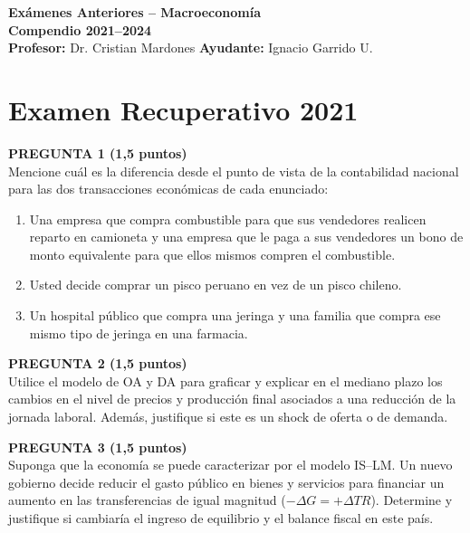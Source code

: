 \documentclass[11pt,addpoints]{article}
\begin{document}
\vspace*{0.1cm}

\begin{center}
{\Large \bfseries Exámenes Anteriores – Macroeconomía \\[0.25cm]}
\textbf{Compendio 2021–2024}\\[0.3cm]
\textbf{Profesor:} Dr. Cristian Mardones \textbf{Ayudante:} Ignacio Garrido U.
\end{center}


\section*{Examen Recuperativo 2021}

\textbf{PREGUNTA 1 (1,5 puntos)}\\[0.2cm]
Mencione cuál es la diferencia desde el punto de vista de la contabilidad nacional para las dos transacciones económicas de cada enunciado:

\begin{enumerate}[label=\alph*)]
\item Una empresa que compra combustible para que sus vendedores realicen reparto en camioneta y una empresa que le paga a sus vendedores un bono de monto equivalente para que ellos mismos compren el combustible.
\item Usted decide comprar un pisco peruano en vez de un pisco chileno.
\item Un hospital público que compra una jeringa y una familia que compra ese mismo tipo de jeringa en una farmacia.
\end{enumerate}

\vspace{0.4cm}

\textbf{PREGUNTA 2 (1,5 puntos)}\\[0.2cm]
Utilice el modelo de OA y DA para graficar y explicar en el mediano plazo los cambios en el nivel de precios y producción final asociados a una reducción de la jornada laboral. Además, justifique si este es un shock de oferta o de demanda.

\vspace{0.4cm}

\textbf{PREGUNTA 3 (1,5 puntos)}\\[0.2cm]
Suponga que la economía se puede caracterizar por el modelo IS–LM.  
Un nuevo gobierno decide reducir el gasto público en bienes y servicios para financiar un aumento en las transferencias de igual magnitud ($-\Delta G = +\Delta TR$). Determine y justifique si cambiaría el ingreso de equilibrio y el balance fiscal en este país.
\end{document}
